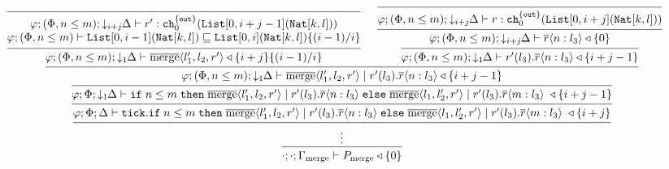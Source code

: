 %
{\tiny
\begin{align*}
&\kern-2em\begin{prooftree}
\Infer0{ \begin{matrix}
\varphi;(\Phi,n\leq m);\downarrow_{i+j}\!\!\Delta\vdash r' : \texttt{ch}^{\{\texttt{out}\}}_{0}(\texttt{List}[0,i+j-1](\texttt{Nat}[k,l]))\\
%
 \varphi;(\Phi,n\leq m)\vdash \texttt{List}[0,i-1](\texttt{Nat}[k,l]) \sqsubseteq \texttt{List}[0,i](\texttt{Nat}[k,l])\{(i-1)/i\}
\end{matrix}
}
\Infer1{ \varphi;(\Phi,n\leq m);\downarrow_1\!\!\Delta\vdash \overline{\text{merge}}\langle l_1', l_2, r' \rangle \triangleleft \{i+j\}\{(i-1)/i\} }
%
\Infer0{ \varphi;(\Phi,n\leq m);\downarrow_{i+j}\!\!\Delta\vdash r : \texttt{ch}^{\{\texttt{out}\}}_{0}(\texttt{List}[0,i+j](\texttt{Nat}[k,l])) }
\Infer1{ \varphi;(\Phi,n\leq m);\downarrow_{i+j}\!\!\Delta\vdash \overline{r}\langle n : l_3 \rangle \triangleleft \{0\} }
\Infer1{\varphi;(\Phi,n\leq m);\downarrow_1\!\!\Delta\vdash r'(l_3).\overline{r}\langle n : l_3 \rangle \triangleleft \{i+j-1\} }
%
\Infer2{\varphi;(\Phi,n\leq m);\downarrow_1\!\!\Delta\vdash \overline{\text{merge}}\langle l_1', l_2, r' \rangle \mid r'(l_3).\overline{r}\langle n : l_3 \rangle \triangleleft \{i+j-1\} }
%
\Infer1{\varphi;\Phi;\downarrow_1\!\!\Delta\vdash \texttt{if}\; n\leq m\;\texttt{then}\; \overline{\text{merge}}\langle l_1', l_2, r' \rangle \mid r'(l_3).\overline{r}\langle n : l_3 \rangle \;\texttt{else}\; \overline{\text{merge}}\langle l_1, l_2', r' \rangle \mid r'(l_3).\overline{r}\langle m : l_3 \rangle\; \triangleleft \{i+j - 1\} }
%
\Infer1{\varphi;\Phi;\Delta\vdash \tick{\texttt{if}\; n\leq m\;\texttt{then}\; \overline{\text{merge}}\langle l_1', l_2, r' \rangle \mid r'(l_3).\overline{r}\langle n : l_3 \rangle \;\texttt{else}\; \overline{\text{merge}}\langle l_1, l_2', r' \rangle \mid r'(l_3).\overline{r}\langle m : l_3 \rangle\; \triangleleft \{i+j\}}}
%
\Infer1{\vdots}
%
\Infer1{\cdot;\cdot;\Gamma_{\text{merge}}\vdash P_{\text{merge}} \triangleleft \{0\}}
\end{prooftree}
\end{align*}}






